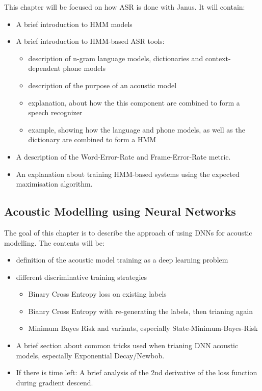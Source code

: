 This chapter will be focused on how ASR is done with Janus. It will contain: 
\begin{itemize}
	\item A brief introduction to HMM models
	\item A brief introduction to HMM-based ASR tools:
	\begin{itemize}
		\item description of n-gram language models, dictionaries and context-dependent phone models
		\item description of the purpose of an acoustic model
		\item explanation, about how the this component are combined to form a speech recognizer 
		\item example, showing how the language and phone models, as well as the dictionary are combined to form a HMM
	\end{itemize}
	\item A description of the Word-Error-Rate and Frame-Error-Rate metric. 
	\item An explanation about training HMM-based systems using the expected maximisation algorithm. 
\end{itemize}

\subsection{Acoustic Modelling using Neural Networks}
\label{ch:acoustic_modelling}
The goal of this chapter is to describe the approach of using DNNs for acoustic modelling.
The contents will be: 
\begin{itemize}
	\item definition of the acoustic model training as a deep learning problem
	\item different discriminative training strategies
	\begin{itemize}
		\item Binary Cross Entropy loss on existing labels
		\item Bianry Cross Entropy with re-generating the labels, then trianing again
		\item Minimum Bayes Risk and variants, especially State-Minimum-Bayes-Risk
	\end{itemize}
	\item A brief section about common tricks used when trianing DNN acoustic models, 
	especially Exponential Decay/Newbob.
	\item If there is time left: A brief analysis of the 2nd derivative of the loss function
	during gradient descend.
\end{itemize}

